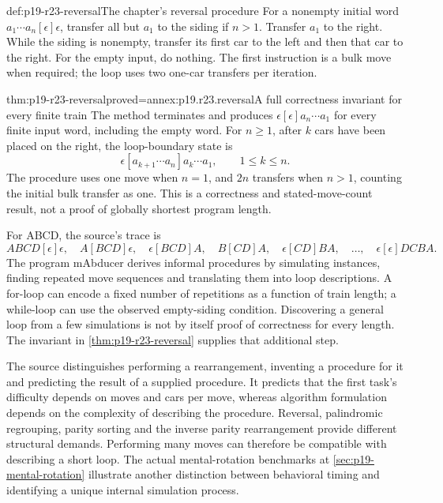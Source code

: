 \begin{hbmethod}{def:p19-r23-reversal}{The chapter's reversal procedure}
For a nonempty initial word \(a_1\cdots a_n[\epsilon]\epsilon\),
transfer all but \(a_1\) to the siding if \(n>1\). Transfer
\(a_1\) to the right. While the siding is nonempty, transfer its
first car to the left and then that car to the right. For the empty input,
do nothing. The first instruction is a bulk move when required; the loop
uses two one-car transfers per iteration.
\end{hbmethod}

\begin{hbtheorem}{thm:p19-r23-reversal}{proved=annex:p19.r23.reversal}{A full correctness invariant for every finite train}
The method terminates and produces
\(\epsilon[\epsilon]a_n\cdots a_1\) for every finite input word,
including the empty word. For \(n\geq1\), after \(k\) cars have
been placed on the right, the loop-boundary state is
\[
 \epsilon[a_{k+1}\cdots a_n]a_k\cdots a_1,
       \qquad 1\leq k\leq n.
\]
The procedure uses one move when \(n=1\), and \(2n\) transfers when
\(n>1\), counting the initial bulk transfer as one. This is a
correctness and stated-move-count result, not a proof of globally shortest
program length.
\end{hbtheorem}

For ABCD, the source's trace is
\[
 ABCD[\epsilon]\epsilon,\quad A[BCD]\epsilon,\quad
 \epsilon[BCD]A,\quad B[CD]A,\quad\epsilon[CD]BA,
 \quad\ldots,\quad\epsilon[\epsilon]DCBA.
\]
The program mAbducer derives informal procedures by simulating instances,
finding repeated move sequences and translating them into loop
descriptions. A for-loop can encode a fixed number of repetitions as a
function of train length; a while-loop can use the observed empty-siding
condition. Discovering a general loop from a few simulations is not by
itself proof of correctness for every length. The invariant in
\cref{thm:p19-r23-reversal} supplies that additional step.

The source distinguishes performing a rearrangement, inventing a procedure
for it and predicting the result of a supplied procedure. It predicts
that the first task's difficulty depends on moves and cars per move,
whereas algorithm formulation depends on the complexity of describing
the procedure. Reversal, palindromic regrouping, parity sorting and the
inverse parity rearrangement provide different structural demands.
Performing many moves can therefore be compatible with describing a
short loop. The actual mental-rotation benchmarks at
\cref{sec:p19-mental-rotation} illustrate another distinction between
behavioral timing and identifying a unique internal simulation process.

